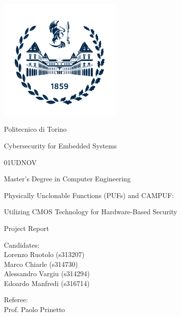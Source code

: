 \documentclass[10pt,  english, makeidx, a4paper, titlepage, oneside]{book}
\begin{document}
\frontmatter
\begin{titlepage}
\vspace{0cm}
\centerline{
\includegraphics[width=6cm]{./logopolitonuovo}} 
\vspace{0.5cm}
\centerline{\LARGE Politecnico di Torino}
\vspace{2.5cm}
\centerline{\huge Cybersecurity for Embedded Systems}
\vspace{0.25cm}
\centerline{\huge 01UDNOV}
\vspace{1cm}
\centerline{\Large Master's Degree in Computer Engineering}
\vspace{2cm}
\centerline{\huge Physically Unclonable Functions (PUFs) and CAMPUF:}
\centerline{\huge Utilizing CMOS Technology for Hardware-Based Security}
\bigskip
\centerline{\huge Project Report}
\vspace{2cm}
\vfill
\begin{minipage}{6.5cm} %
\Large{Candidates:\\
Lorenzo Ruotolo (s313207)\\
Marco Chiarle (s314730)\\
Alessandro Vargiu (s314294)\\
Edoardo Manfredi (s316714)}
\end{minipage}
\hfill
\begin{minipage}{4.4cm}
\Large{Referee: \\
Prof. Paolo Prinetto}
\end{minipage}
\end{titlepage}

\tableofcontents
\listoffigures %
\listoftables %

\mainmatter
    


%








    

\appendix

%

\end{document}

